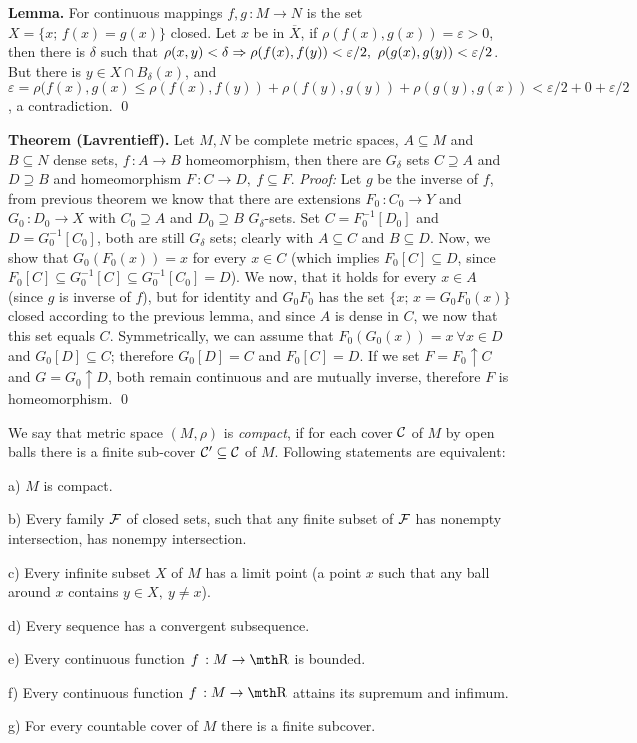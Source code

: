 \medskip
{\bf Lemma.} For continuous mappings $f,g\,:M\to N$ is the set $X = \{ x;\,
f (x) = g (x) \}$ closed. Let $x$ be in $\overline X$, if
$\rho(f(x), g (x)) = \varepsilon > 0$, then there is $\delta$ such that
$\rho(x,y) < \delta \Rightarrow \rho(f(x),f(y)) < \varepsilon/2,\ \rho(g(x),g(y)) <
\varepsilon/2$. But there is $y \in X \cap B_\delta(x)$, and $\varepsilon =
\rho(f(x),g(x) \leq \rho(f(x),f(y)) + \rho(f(y),g(y)) + \rho(g(y),g(x)) <
\varepsilon/2 + 0 + \varepsilon/2$, a contradiction. \qed
\smallskip

{\bf Theorem (Lavrentieff).} Let $M,N$ be complete metric spaces, 
$A\subseteq M$ and $B\subseteq N$ dense sets, $f\,:A\to B$ homeomorphism, then 
there are $G_\delta$ sets $C\supseteq A$ and $D\supseteq B$ and homeomorphism 
$F\,: C\to D,\ f\subseteq F$.
\smallskip
{\it Proof:} Let $g$ be the inverse of $f$, from previous theorem we know that 
there are extensions $F_0\,:C_0\to Y$ and $G_0\,:D_0\to X$ with $C_0\supseteq 
A$ and $D_0 \supseteq B$ $G_\delta$-sets. Set $C = F_0^{-1}[D_0]$ and 
$D = G_0^{-1}[C_0]$, both are still $G_\delta$ sets; clearly with 
$A\subseteq C$ and $B\subseteq D$. Now, we show that $G_0(F_0(x)) = x$ for every 
$x\in C$ (which implies $F_0[C]\subseteq D$, since $F_0[C] \subseteq G_0^{-1} 
[C] \subseteq G_0^{-1}[C_0] = D$). 
We now, that it holds for every $x\in A$ (since $g$ is inverse of $f$), but for
identity and $G_0F_0$ has the set $\{x;\, x = G_0F_0(x) \}$ closed according to
the previous lemma, and since $A$ is dense in $C$, we now that this set equals
$C$. 
Symmetrically, we can 
assume that $F_0(G_0(x)) = x\ \forall x\in D$ and $G_0[D]\subseteq C$; therefore 
$G_0[D] = C$ and $F_0[C]=D$. If we set $F=F_0\uparrow C$ and $G=G_0\uparrow D$, 
both remain continuous and are mutually inverse, therefore $F$ is homeomorphism.
\qed
\medskip


 We say that metric space $(M,\rho)$ is {\it compact}, if for 
each cover $\cal C$ of $M$ by open balls there is a finite sub-cover $\cal 
C'\subseteq C$ of $M$. Following statements are equivalent:
{\parindent0.5in\parskip6pt
	\item{a)} $M$ is compact.
	\item{b)} Every family $\cal F$ of closed sets, such that any finite 
		subset of $\cal F$ has nonempty intersection, has nonempy intersection.
	\item{c)} Every infinite subset $X$ of $M$ has a limit point (a point 
		$x$ such that any ball around $x$ contains $y\in X,\ y\neq x$).
	\item{d)} Every sequence has a convergent subsequence.
	\item{e)} Every continuous function $f\,:M\to \R$ is bounded.
	\item{f)} Every continuous function $f\,:M\to \R$ attains its supremum and 
		infimum.
	\item{g)} For every countable cover of $M$ there is a finite subcover.

}

